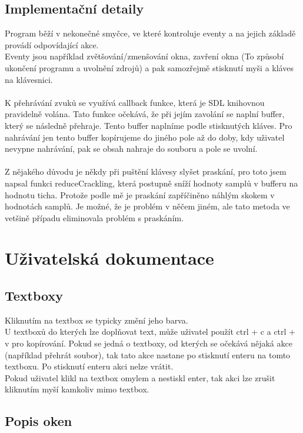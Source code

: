 \documentclass[12pt]{article}
\begin{document}
	\subsection{Implementační detaily}
	Program běží v nekonečné smyčce, ve které kontroluje eventy a na jejich základě provádí odpovídající akce.
	\\
	 Eventy jsou například zvětšování/zmenšování okna, zavření okna (To způsobí ukončení programu a uvolnění zdrojů) a pak samozřejmě stisknutí myši a kláves na klávesnici.
	\\
	\\
	K přehrávání zvuků se využívá callback funkce, která je SDL knihovnou pravidelně volána. Tato funkce očekává, že při jejím zavolání se naplní buffer, který se následně přehraje. Tento buffer naplníme podle stisknutých kláves. Pro nahrávání jen tento buffer kopírujeme do jiného pole až do doby, kdy uživatel nevypne nahrávání, pak se obsah nahraje do souboru a pole se uvolní. 
	\\ 
	\\
	Z nějakého důvodu je někdy při puštění klávesy slyšet praskání, pro toto jsem napsal funkci reduceCrackling, která postupně sníží hodnoty samplů v bufferu na hodnotu ticha. Protože podle mě je praskání zapříčiněno náhlým skokem v hodnotách samplů. Je možné, že je problém v něčem jiném, ale tato metoda ve vetšině případu eliminovala problém s praskáním.
	
	\newpage  
	\maketitle\section{Uživatelská dokumentace}
	\subsection{Textboxy}
	Kliknutím na textbox se typicky změní jeho barva.
	\\
	U textboxů do kterých lze doplňovat text, může uživatel použít ctrl + c a ctrl + v pro kopírování. Pokud se jedná o textboxy, od kterých se očekává nějaká akce (například přehrát soubor), tak tato akce nastane po stisknutí enteru na tomto textboxu. Po stisknutí enteru akci nelze vrátit.
	\\
	 Pokud uživatel klikl na textbox omylem a nestiskl enter, tak akci lze zrušit kliknutím myší kamkoliv mimo textbox. 
	\subsection{Popis oken}
\end{document}
